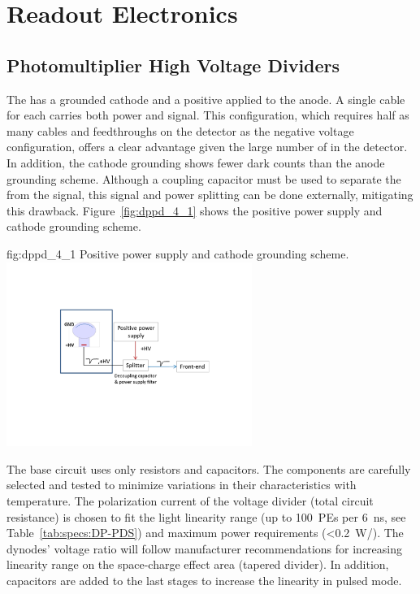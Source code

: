 \section{Readout Electronics}
\label{sec:dp-pds-electronics}

\subsection{Photomultiplier High Voltage Dividers}
\label{sec:fddp-pd-4.1}

The  has a grounded cathode and a positive  applied to the anode. A single cable for each  carries both power and signal. This configuration, which requires half as many cables and feedthroughs on the detector as the negative voltage configuration, offers a clear advantage given the large number of  in the detector. In addition, the cathode grounding shows fewer dark counts than the anode grounding scheme. Although a coupling capacitor must be used to separate the  from the  signal, this signal and power splitting can be done externally, mitigating this drawback.  Figure~\ref{fig:dppd_4_1} shows the positive power supply and cathode grounding scheme.

\begin{dunefigure}{fig:dppd_4_1}
{Positive power supply and cathode grounding scheme.}
\includegraphics[width=0.6\textwidth]{graphics/dppd_4_1}
\end{dunefigure}

The  base circuit uses only resistors and capacitors. The components are carefully selected and tested to minimize variations in their characteristics with temperature. The polarization current of the voltage divider (total circuit resistance) is chosen to fit the  light linearity range (up to \SI{100}{PEs} per \SI{6}{\ns}, see Table~\ref{tab:specs:DP-PDS}) and maximum power requirements (\SI{<0.2}{W/}). The dynodes' voltage ratio will follow manufacturer recommendations for increasing linearity range on the space-charge effect area (tapered divider). In addition, capacitors are added to the last stages  to increase the  linearity in pulsed mode.


